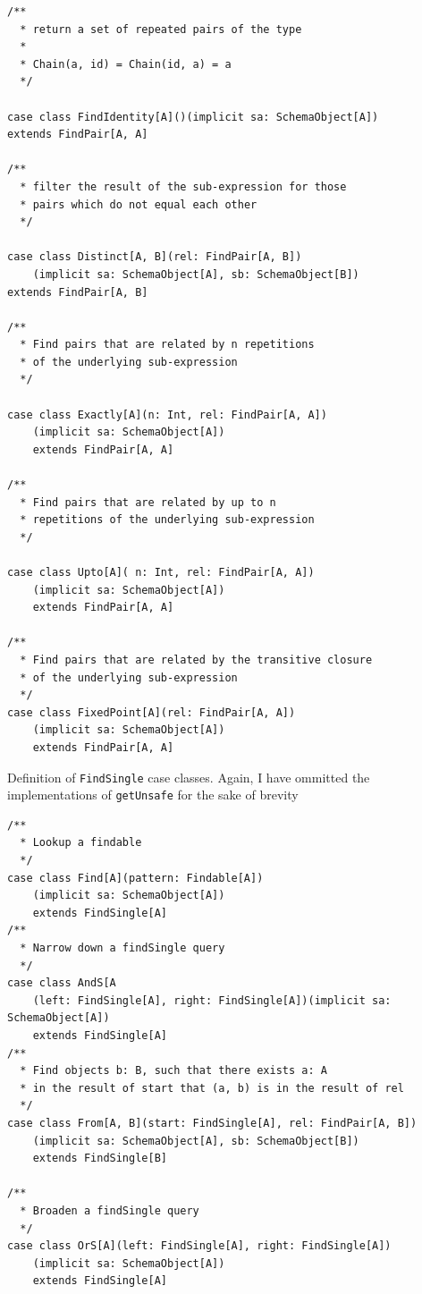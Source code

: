 \documentclass[12pt,a4paper,twoside,openright]{report}
\newcommand\codeName[1]{\texttt{#1}}
\renewcommand{\baselinestretch}{1.1}    %
\begin{document}
\begin{framed}
\begin{verbatim}
/**
  * return a set of repeated pairs of the type
  *
  * Chain(a, id) = Chain(id, a) = a
  */

case class FindIdentity[A]()(implicit sa: SchemaObject[A])
extends FindPair[A, A]

/**
  * filter the result of the sub-expression for those
  * pairs which do not equal each other
  */

case class Distinct[A, B](rel: FindPair[A, B])
    (implicit sa: SchemaObject[A], sb: SchemaObject[B])
extends FindPair[A, B]

/**
  * Find pairs that are related by n repetitions
  * of the underlying sub-expression
  */

case class Exactly[A](n: Int, rel: FindPair[A, A])
    (implicit sa: SchemaObject[A])
    extends FindPair[A, A]

/**
  * Find pairs that are related by up to n
  * repetitions of the underlying sub-expression
  */

case class Upto[A]( n: Int, rel: FindPair[A, A])
    (implicit sa: SchemaObject[A])
    extends FindPair[A, A]

/**
  * Find pairs that are related by the transitive closure
  * of the underlying sub-expression
  */
case class FixedPoint[A](rel: FindPair[A, A])
    (implicit sa: SchemaObject[A])
    extends FindPair[A, A]

\end{verbatim}
\end{framed}
\renewcommand{\baselinestretch}{1.1}

Definition of \codeName{FindSingle} case classes. Again, I have ommitted the implementations of \codeName{getUnsafe} for the sake of brevity
\renewcommand{\baselinestretch}{0.8}
\begin{framed}
\begin{verbatim}
/**
  * Lookup a findable
  */
case class Find[A](pattern: Findable[A])
    (implicit sa: SchemaObject[A])
    extends FindSingle[A]
/**
  * Narrow down a findSingle query
  */
case class AndS[A
    (left: FindSingle[A], right: FindSingle[A])(implicit sa: SchemaObject[A])
    extends FindSingle[A]
/**
  * Find objects b: B, such that there exists a: A
  * in the result of start that (a, b) is in the result of rel
  */
case class From[A, B](start: FindSingle[A], rel: FindPair[A, B])
    (implicit sa: SchemaObject[A], sb: SchemaObject[B])
    extends FindSingle[B]

/**
  * Broaden a findSingle query
  */
case class OrS[A](left: FindSingle[A], right: FindSingle[A])
    (implicit sa: SchemaObject[A])
    extends FindSingle[A]
\end{verbatim}
\end{framed}
\renewcommand{\baselinestretch}{1.1}
\end{document}
